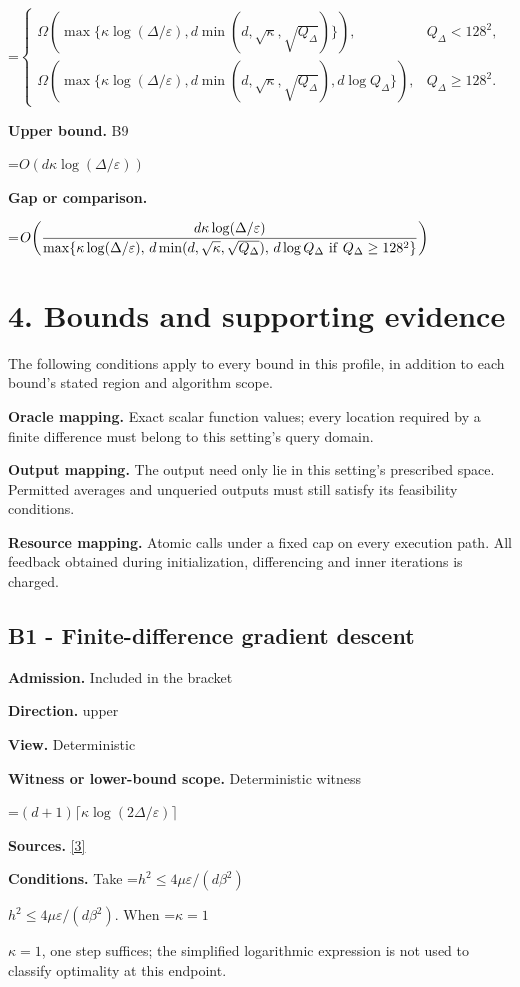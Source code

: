 \documentclass[10pt,a4paper]{article}
\newcommand{\AtlasMath}[1]{\par\begingroup\centering\setbox0=\hbox{$\displaystyle #1$}\ifdim\wd0>1.4\linewidth\typeout{ATLAS WIDE FORMULA: \the\wd0}\fi\ifdim\wd0>\linewidth\resizebox{\linewidth}{!}{\box0}\else\box0\fi\par\endgroup}
\newcommand{\AtlasInlineMath}[1]{\begingroup\setbox0=\hbox{$#1$}\ifdim\wd0>.4\linewidth\endgroup\AtlasMath{#1}\else\endgroup$#1$\fi}
\begin{document}
\AtlasMath{\begin{cases}\Omega(\max\{\kappa\log(\Delta/\varepsilon),d\min(d,\sqrt\kappa,\sqrt{Q_\Delta})\}),&Q_\Delta<128^2,\\\Omega(\max\{\kappa\log(\Delta/\varepsilon),d\min(d,\sqrt\kappa,\sqrt{Q_\Delta}),d\log Q_\Delta\}),&Q_\Delta\ge128^2.\end{cases}}
\textbf{Upper bound.} B9

\AtlasMath{O(d\kappa\log(\Delta/\varepsilon))}
\textbf{Gap or comparison.} 
\AtlasMath{O\!\left(\frac{d\kappa\log(\Delta/\varepsilon)}{\max\{\kappa\log(\Delta/\varepsilon),\,d\min(d,\sqrt\kappa,\sqrt{Q_\Delta}),\,d\log Q_\Delta\ {\rm if}\ Q_\Delta\ge128^2\}}\right)}


\section{4. Bounds and supporting evidence}
The following conditions apply to every bound in this profile, in addition to each bound's stated region and algorithm scope.

\textbf{Oracle mapping.} Exact scalar function values; every location required by a finite difference must belong to this setting's query domain.

\textbf{Output mapping.} The output need only lie in this setting's prescribed space. Permitted averages and unqueried outputs must still satisfy its feasibility conditions.

\textbf{Resource mapping.} Atomic calls under a fixed cap on every execution path. All feedback obtained during initialization, differencing and inner iterations is charged.

\subsection{B1 - Finite-difference gradient descent}
\textbf{Admission.} Included in the bracket

\textbf{Direction.} upper

\textbf{View.} Deterministic

\textbf{Witness or lower-bound scope.} Deterministic witness

\AtlasMath{(d+1)\lceil\kappa\log(2\Delta/\varepsilon)\rceil}
\textbf{Sources.} \href{https://proceedings.mlr.press/v195/yue23a/yue23a.pdf}{[3]}

\textbf{Conditions.} Take \AtlasInlineMath{h^2\le4\mu\varepsilon/(d\beta ^2)}. When \AtlasInlineMath{\kappa=1}, one step suffices; the simplified logarithmic expression is not used to classify optimality at this endpoint.
\end{document}
